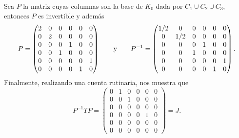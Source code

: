 \begin{example}
  Sea $P$ la matriz cuyas columnas son la base de $K_0$ dada por $C_1 \cup C_2 \cup C_3$, entonces $P$ es invertible y además
  \[
    P =  \begin{pmatrix}
      2 & 0 & 0 & 0 & 0 & 0 \\
      0 & 2 & 0 & 0 & 0 & 0 \\
      0 & 0 & 0 & 1 & 0 & 0 \\
      0 & 0 & 1 & 0 & 0 & 0 \\
      0 & 0 & 0 & 0 & 0 & 1 \\
      0 & 0 & 0 & 0 & 1 & 0
    \end{pmatrix}
    \qquad\text{y}\qquad
    P^{-1} =  \begin{pmatrix} 1/2 & 0 & 0 & 0 & 0 & 0 \\ 0 & 1/2 & 0 & 0 & 0 & 0 \\ 0 & 0 & 0 & 1 & 0 & 0 \\ 0 & 0 & 1 & 0 & 0 & 0 \\  0 & 0 & 0 & 0 & 0 & 1 \\ 0 & 0 & 0 & 0 & 1 & 0 \end{pmatrix}.
  \]
  Finalmente, realizando una cuenta rutinaria, nos muestra que
    \[
      P^{-1}TP 
        = \begin{pmatrix} 0 & 1 & 0 & 0 & 0 & 0 \\ 0 & 0 & 1 & 0 & 0 & 0 \\ 0 & 0 & 0 & 0 & 0 & 0 \\ 0 & 0 & 0 & 0 & 1 &0 \\ 0 & 0 & 0 & 0 & 0 & 0 \\ 0 & 0 & 0 & 0 & 0 & 0 \end{pmatrix} = J.
    \]
\end{example}

